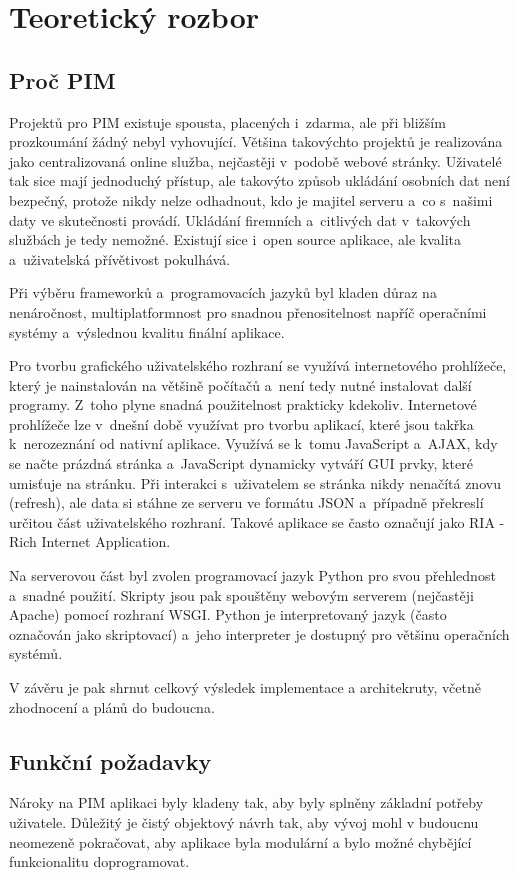 \documentclass[bc,male,html,dept460]{diploma}				%
\begin{document}
\section{Teoretický rozbor}
\label{sec:teorie}
\subsection{Proč PIM}
Projektů pro PIM existuje spousta, placených i~zdarma, ale při bližším prozkoumání žádný nebyl vyhovující.
Většina takovýchto projektů je realizována jako centralizovaná online služba, nejčastěji v~podobě webové stránky.
Uživatelé tak sice mají jednoduchý přístup, ale takovýto způsob ukládání osobních dat není bezpečný, protože nikdy nelze odhadnout, kdo je majitel serveru a~co s~našimi daty ve skutečnosti provádí. Ukládání firemních a~citlivých dat v~takových službách je tedy nemožné.
Existují sice i~open source aplikace, ale kvalita a~uživatelská přívětivost pokulhává.

Při výběru frameworků a~programovacích jazyků byl kladen důraz na nenáročnost, multiplatformnost pro snadnou přenositelnost napříč operačními systémy a~výslednou kvalitu finální aplikace.

Pro tvorbu grafického uživatelského rozhraní se využívá internetového prohlížeče, který je nainstalován na většině počítačů a~není tedy nutné instalovat další programy. Z~toho plyne snadná použitelnost prakticky kdekoliv.
Internetové prohlížeče lze v~dnešní době využívat pro tvorbu aplikací, které jsou takřka k~nerozeznání od nativní aplikace.
Využívá se k~tomu JavaScript a~AJAX, kdy se načte prázdná stránka a~JavaScript dynamicky vytváří GUI prvky, které umisťuje na stránku.
Při interakci s~uživatelem se stránka nikdy nenačítá znovu (refresh), ale data si stáhne ze serveru ve formátu JSON a~případně překreslí určitou část uživatelského rozhraní. Takové aplikace se často označují jako RIA - Rich Internet Application.

Na serverovou část byl zvolen programovací jazyk Python pro svou přehlednost a~snadné použití. Skripty jsou pak spouštěny webovým serverem (nejčastěji Apache) pomocí rozhraní WSGI. Python je interpretovaný jazyk (často označován jako skriptovací) a~jeho interpreter je dostupný pro většinu operačních systémů.

V závěru je pak shrnut celkový výsledek implementace a architekruty, včetně zhodnocení a plánů do budoucna.

\newpage
\subsection{Funkční požadavky}
Nároky na PIM aplikaci byly kladeny tak, aby byly splněny základní potřeby uživatele. Důležitý je čistý objektový návrh tak, aby vývoj mohl v budoucnu neomezeně pokračovat, aby aplikace byla modulární a bylo možné chybějící funkcionalitu doprogramovat.
\end{document}
